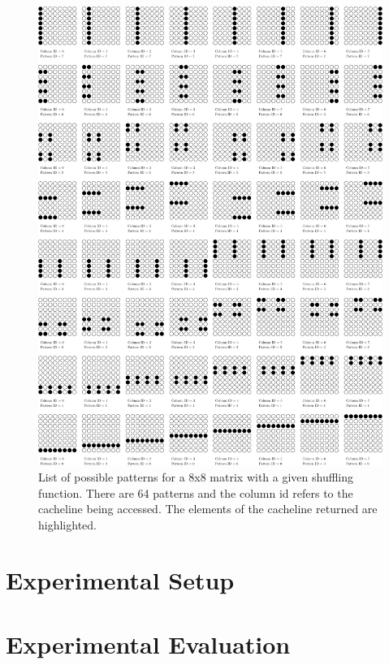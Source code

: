 \documentclass[letterpaper]{article}
\begin{document}
\begin{figure}[ht]
	\centering
	\includegraphics[width=\textwidth]{images/pattern}
	\caption{List of possible patterns for a 8x8 matrix with a given shuffling
	function. There are 64 patterns and the column id refers to the cacheline
	being accessed. The elements of the cacheline returned are highlighted.}
	\label{fig:pattern}
\end{figure}

\section{Experimental Setup}

\section{Experimental Evaluation}
\end{document}
